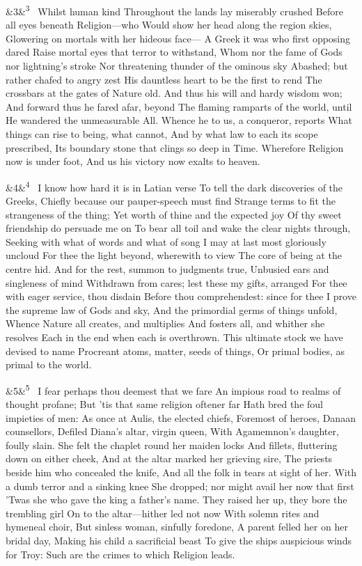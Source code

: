 \documentclass[12pt]{article}
\newcommand{\para}[1][]{\par\noindent\ifx&#1&\else\textsuperscript{\footnotesize #1}~\fi}
\begin{document}
\para[3] Whilst human kind Throughout the lands lay miserably crushed Before all eyes beneath Religion---who Would show her head along the region skies, Glowering on mortals with her hideous face--- A Greek it was who first opposing dared Raise mortal eyes that terror to withstand, Whom nor the fame of Gods nor lightning's stroke Nor threatening thunder of the ominous sky Abashed; but rather chafed to angry zest His dauntless heart to be the first to rend The crossbars at the gates of Nature old. And thus his will and hardy wisdom won; And forward thus he fared afar, beyond The flaming ramparts of the world, until He wandered the unmeasurable All. Whence he to us, a conqueror, reports What things can rise to being, what cannot, And by what law to each its scope prescribed, Its boundary stone that clings so deep in Time. Wherefore Religion now is under foot, And us his victory now exalts to heaven.

\para[4] I know how hard it is in Latian verse To tell the dark discoveries of the Greeks, Chiefly because our pauper-speech must find Strange terms to fit the strangeness of the thing; Yet worth of thine and the expected joy Of thy sweet friendship do persuade me on To bear all toil and wake the clear nights through, Seeking with what of words and what of song I may at last most gloriously uncloud For thee the light beyond, wherewith to view The core of being at the centre hid. And for the rest, summon to judgments true, Unbusied ears and singleness of mind Withdrawn from cares; lest these my gifts, arranged For thee with eager service, thou disdain Before thou comprehendest: since for thee I prove the supreme law of Gods and sky, And the primordial germs of things unfold, Whence Nature all creates, and multiplies And fosters all, and whither she resolves Each in the end when each is overthrown. This ultimate stock we have devised to name Procreant atoms, matter, seeds of things, Or primal bodies, as primal to the world.

\para[5] I fear perhaps thou deemest that we fare An impious road to realms of thought profane; But 'tis that same religion oftener far Hath bred the foul impieties of men: As once at Aulis, the elected chiefs, Foremost of heroes, Danaan counsellors, Defiled Diana's altar, virgin queen, With Agamemnon's daughter, foully slain. She felt the chaplet round her maiden locks And fillets, fluttering down on either cheek, And at the altar marked her grieving sire, The priests beside him who concealed the knife, And all the folk in tears at sight of her. With a dumb terror and a sinking knee She dropped; nor might avail her now that first 'Twas she who gave the king a father's name. They raised her up, they bore the trembling girl On to the altar---hither led not now With solemn rites and hymeneal choir, But sinless woman, sinfully foredone, A parent felled her on her bridal day, Making his child a sacrificial beast To give the ships auspicious winds for Troy: Such are the crimes to which Religion leads.
\end{document}
